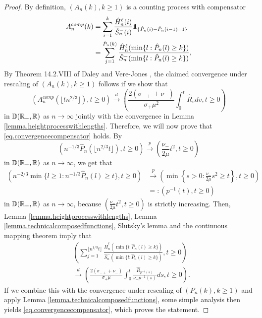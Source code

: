 \begin{proof}
By definition, $(A_n(k),k\geq 1)$ is a counting process with compensator 
\begin{align*}
    A_n^{comp}(k)&=\sum_{i=1}^k \frac{\hat{H}^\ell_n(i)}{\hat{S}^-_n(i)}\one_{\{\hat{P}_n(i)-\hat{P}_n(i-1)=1\}}\\
    &=\sum_{j=1}^{\hat{P}_n(k)}\frac{\hat{H}^\ell_n(\min\{l:\hat{P}_n(l)\geq k\})}{\hat{S}^-_n(\min\{l:\hat{P}_n(l)\geq k\})},
\end{align*}
 By Theorem 14.2.VIII of Daley and Vere-Jones \cite{DaleyVereJones}, the claimed convergence under rescaling of $(A_n(k),k\geq 1)$ follows if we show that 
\begin{equation}\label{eq.convergencecompensator}
    \left(A_n^{comp}\left(\lfloor tn^{2/3}\rfloor \right), t\geq 0\right)\overset{d}{\to}\left(\frac{2(\sigma_{-+}+\nu_-)}{\sigma_+\mu^2} \int_0^t\hat{R}_v dv, t \geq 0\right)
\end{equation}
in ${\mathbb D}({\mathbb R}_+,{\mathbb R})$ as $n\to \infty$ jointly with the convergence in Lemma \ref{lemma.heightprocesswithlengths}. Therefore, we will now prove that \eqref{eq.convergencecompensator} holds. 
By
$$\left(n^{-1/3}\hat{P}_n\left(\lfloor n^{2/3}t\rfloor \right),t\geq 0\right)\overset{p}{\to}\left(\frac{\nu_-}{2\mu}t^2,t\geq 0\right)$$
in ${\mathbb D}({\mathbb R}_+,{\mathbb R})$ as $n\to \infty$,
we get that
\begin{align*}\left(n^{-2/3}\min\{l\geq 1:n^{-1/3}\hat{P}_n(l)\geq t\},t\geq 0\right)&\overset{p}{\to}\left(\min\left\{s>0: \frac{\nu_-}{2\mu}s^2\geq t\right \}, t\geq 0\right)\\
&=:\left(p^{-1}(t),t\geq 0\right) \end{align*}
in ${\mathbb D}({\mathbb R}_+,{\mathbb R})$ as $n\to \infty$, because $\left(\frac{\nu_-}{2\mu}t^2,t\geq 0\right)$ is strictly increasing. Then, Lemma \ref{lemma.heightprocesswithlengths}, Lemma \ref{lemma.technicalcomposedfunctions}, Slutsky's lemma and the continuous mapping theorem imply that 
\begin{align*}&\left(\sum_{j=1}^{\lfloor n^{1/3}t\rfloor}\frac{\hat{H}^\ell_n(\min\{l:\hat{P}_n(l)\geq k\})}{\hat{S}^-_n(\min\{l:\hat{P}_n(l)\geq k\})},t\geq 0\right)\\
&\overset{d}{\to} \left( \frac{2(\sigma_{-+}+\nu_-)}{\sigma_+\mu} \int_0^t \frac{\hat{R}_{p^{-1}(s)}}{\nu_- p^{-1}(s)}ds,t\geq 0 \right).
\end{align*}
If we combine this with the convergence under rescaling of $(P_n(k),k\geq 1)$ and apply Lemma \ref{lemma.technicalcomposedfunctions}, some simple analysis then yields \eqref{eq.convergencecompensator}, which proves the statement.
\end{proof}

